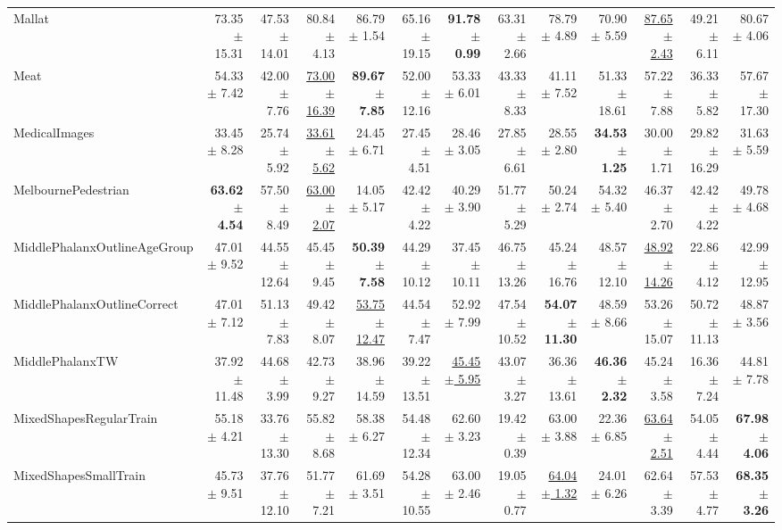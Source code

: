 \begin{landscape}
\begin{longtable}{lrrrrrrrrrrrr}
Mallat & 73.35 $\pm$ 15.31 & 47.53 $\pm$ 14.01 & 80.84 $\pm$ 4.13 & 86.79 $\pm$ 1.54 & 65.16 $\pm$ 19.15 & \textbf{91.78 $\pm$ 0.99} & 63.31 $\pm$ 2.66 & 78.79 $\pm$ 4.89 & 70.90 $\pm$ 5.59 & \underline{87.65 $\pm$ 2.43} & 49.21 $\pm$ 6.11 & 80.67 $\pm$ 4.06 \\
Meat & 54.33 $\pm$ 7.42 & 42.00 $\pm$ 7.76 & \underline{73.00 $\pm$ 16.39} & \textbf{89.67 $\pm$ 7.85} & 52.00 $\pm$ 12.16 & 53.33 $\pm$ 6.01 & 43.33 $\pm$ 8.33 & 41.11 $\pm$ 7.52 & 51.33 $\pm$ 18.61 & 57.22 $\pm$ 7.88 & 36.33 $\pm$ 5.82 & 57.67 $\pm$ 17.30 \\
MedicalImages & 33.45 $\pm$ 8.28 & 25.74 $\pm$ 5.92 & \underline{33.61 $\pm$ 5.62} & 24.45 $\pm$ 6.71 & 27.45 $\pm$ 4.51 & 28.46 $\pm$ 3.05 & 27.85 $\pm$ 6.61 & 28.55 $\pm$ 2.80 & \textbf{34.53 $\pm$ 1.25} & 30.00 $\pm$ 1.71 & 29.82 $\pm$ 16.29 & 31.63 $\pm$ 5.59 \\
MelbournePedestrian & \textbf{63.62 $\pm$ 4.54} & 57.50 $\pm$ 8.49 & \underline{63.00 $\pm$ 2.07} & 14.05 $\pm$ 5.17 & 42.42 $\pm$ 4.22 & 40.29 $\pm$ 3.90 & 51.77 $\pm$ 5.29 & 50.24 $\pm$ 2.74 & 54.32 $\pm$ 5.40 & 46.37 $\pm$ 2.70 & 42.42 $\pm$ 4.22 & 49.78 $\pm$ 4.68 \\
MiddlePhalanxOutlineAgeGroup & 47.01 $\pm$ 9.52 & 44.55 $\pm$ 12.64 & 45.45 $\pm$ 9.45 & \textbf{50.39 $\pm$ 7.58} & 44.29 $\pm$ 10.12 & 37.45 $\pm$ 10.11 & 46.75 $\pm$ 13.26 & 45.24 $\pm$ 16.76 & 48.57 $\pm$ 12.10 & \underline{48.92 $\pm$ 14.26} & 22.86 $\pm$ 4.12 & 42.99 $\pm$ 12.95 \\
MiddlePhalanxOutlineCorrect & 47.01 $\pm$ 7.12 & 51.13 $\pm$ 7.83 & 49.42 $\pm$ 8.07 & \underline{53.75 $\pm$ 12.47} & 44.54 $\pm$ 7.47 & 52.92 $\pm$ 7.99 & 47.54 $\pm$ 10.52 & \textbf{54.07 $\pm$ 11.30} & 48.59 $\pm$ 8.66 & 53.26 $\pm$ 15.07 & 50.72 $\pm$ 11.13 & 48.87 $\pm$ 3.56 \\
MiddlePhalanxTW & 37.92 $\pm$ 11.48 & 44.68 $\pm$ 3.99 & 42.73 $\pm$ 9.27 & 38.96 $\pm$ 14.59 & 39.22 $\pm$ 13.51 & \underline{45.45 $\pm$ 5.95} & 43.07 $\pm$ 3.27 & 36.36 $\pm$ 13.61 & \textbf{46.36 $\pm$ 2.32} & 45.24 $\pm$ 3.58 & 16.36 $\pm$ 7.24 & 44.81 $\pm$ 7.78 \\
MixedShapesRegularTrain & 55.18 $\pm$ 4.21 & 33.76 $\pm$ 13.30 & 55.82 $\pm$ 8.68 & 58.38 $\pm$ 6.27 & 54.48 $\pm$ 12.34 & 62.60 $\pm$ 3.23 & 19.42 $\pm$ 0.39 & 63.00 $\pm$ 3.88 & 22.36 $\pm$ 6.85 & \underline{63.64 $\pm$ 2.51} & 54.05 $\pm$ 4.44 & \textbf{67.98 $\pm$ 4.06} \\
MixedShapesSmallTrain & 45.73 $\pm$ 9.51 & 37.76 $\pm$ 12.10 & 51.77 $\pm$ 7.21 & 61.69 $\pm$ 3.51 & 54.28 $\pm$ 10.55 & 63.00 $\pm$ 2.46 & 19.05 $\pm$ 0.77 & \underline{64.04 $\pm$ 1.32} & 24.01 $\pm$ 6.26 & 62.64 $\pm$ 3.39 & 57.53 $\pm$ 4.77 & \textbf{68.35 $\pm$ 3.26} \\

\end{longtable}
\end{landscape}

